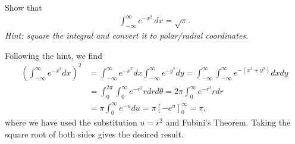 \documentclass[11pt]{article}
\begin{document}


\begin{exercise}
 
Show that 
\begin{align}
    \int_{-\infty}^{\infty} e^{-x^2} \, dx = \sqrt{\pi}. 
\end{align}
\textit{Hint: square the integral and convert it to polar/radial coordinates.}
\end{exercise}
\begin{solution}
    Following the hint, we find
    \begin{align}
        \left(\int_{-\infty}^\infty e^{-x^2} dx\right)^2 &= \int_{-\infty}^\infty e^{-x^2} dx \int_{-\infty}^\infty e^{-y^2} dy = \int_{-\infty}^\infty \int_{-\infty}^\infty e^{-(x^2 + y^2)} dx dy\\
        &= \int_0^{2\pi} \int_0^\infty e^{-r^2} r dr d\theta = 2\pi \int_0^\infty e^{-r^2} r dr \\
        &= \pi \int_0^\infty e^{-u} du = \pi [-e^u]_0^\infty = \pi,
    \end{align}
    where we have used the substitution $u = r^2$ and Fubini's Theorem. Taking the square root of both sides gives the desired result.
\end{solution}
\end{document}
